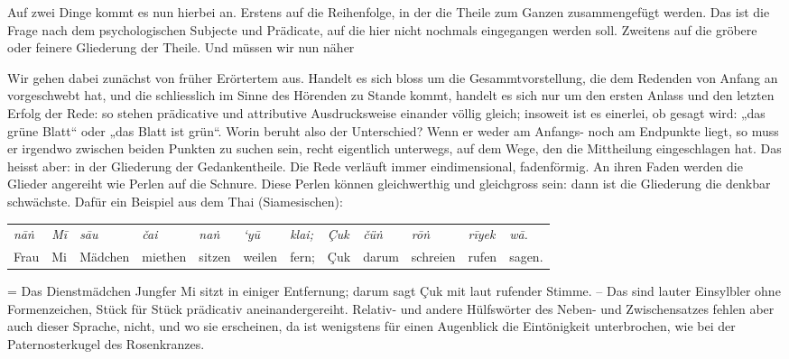 Auf zwei Dinge kommt es nun hierbei an. Erstens auf die Reihenfolge, in der die Theile zum Ganzen zusammengefügt werden. Das ist die Frage nach dem psychologischen Subjecte und Prädicate, auf die hier nicht nochmals eingegangen werden soll. Zweitens auf die gröbere oder feinere Gliederung der Theile. Und  müssen wir nun näher 

Wir gehen dabei zunächst von früher Erörtertem aus. Handelt es sich bloss um die Gesammtvorstellung, die dem Redenden von Anfang an \label{fp.432} vorgeschwebt hat, und die schliesslich im Sinne des Hörenden zu Stande kommt, handelt es sich nur um den ersten Anlass und den letzten Erfolg der Rede: so stehen prädicative und attributive Ausdrucksweise einander völlig gleich; insoweit ist es einerlei, ob gesagt wird: „das grüne Blatt“ oder „das Blatt ist grün“. Worin beruht also der Unterschied? Wenn er weder am Anfangs- noch am Endpunkte liegt, so muss er irgendwo zwischen beiden Punkten zu suchen sein, recht eigentlich unterwegs, auf dem Wege, den die Mittheilung eingeschlagen hat. Das heisst aber: in der Gliederung der Gedankentheile. Die Rede verläuft immer eindimensional, fadenförmig. An ihren Faden werden die Glieder angereiht wie Perlen auf die Schnure. Diese Perlen können gleichwerthig und gleichgross sein: dann ist die Gliederung die denkbar schwächste. Dafür ein Beispiel aus dem Thai (Siamesischen):

\begin{tabular}{l l l l l l l l l l l l}
 \textit{nāṅ} & \textit{Mī} & \textit{sāu} & \textit{čai} & \textit{naṅ} & \textit{‘yū} & \textit{klai;} & \textit{Çuk} & \textit{čüṅ} & \textit{rōṅ} & \textit{rīyek} & \textit{wā.} \\
Frau & Mi & Mädchen & miethen & sitzen & weilen & fern; & Çuk & darum & schreien & rufen & sagen.
\end{tabular}

\noindent = Das Dienstmädchen Jungfer Mi sitzt in einiger Entfernung; darum sagt Çuk mit laut rufender Stimme. – Das sind lauter Einsylbler ohne Formenzeichen, Stück für Stück prädicativ aneinandergereiht. Relativ- und andere Hülfswörter des Neben- und Zwischensatzes fehlen aber auch dieser Sprache, nicht, und wo sie erscheinen, da ist wenigstens für einen Augenblick die Eintönigkeit unterbrochen, wie bei der Paternosterkugel des Rosenkranzes.

